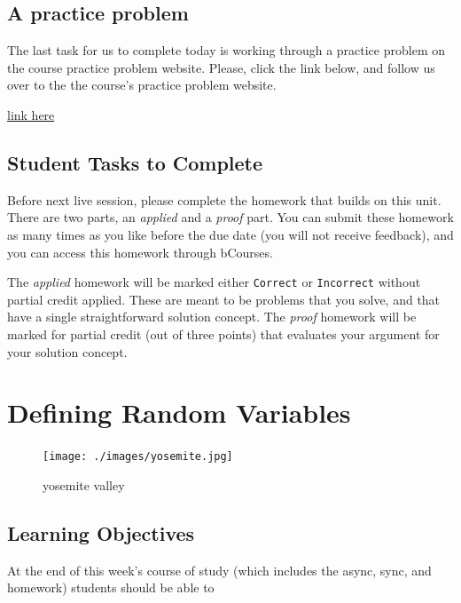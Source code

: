 \documentclass[
]{book}
\theoremstyle{definition}
\theoremstyle{definition}
\theoremstyle{definition}
\theoremstyle{definition}
\theoremstyle{remark}
\begin{document}
\hypertarget{a-practice-problem}{%
\section{A practice problem}\label{a-practice-problem}}

The last task for us to complete today is working through a practice problem on the course practice problem website. Please, click the link below, and follow us over to the the course's practice problem website.

\href{https://mids-w203.github.io/practice_problems/}{link here}

\hypertarget{student-tasks-to-complete}{%
\section{Student Tasks to Complete}\label{student-tasks-to-complete}}

Before next live session, please complete the homework that builds on this unit. There are two parts, an \emph{applied} and a \emph{proof} part. You can submit these homework as many times as you like before the due date (you will not receive feedback), and you can access this homework through bCourses.

The \emph{applied} homework will be marked either \texttt{Correct} or \texttt{Incorrect} without partial credit applied. These are meant to be problems that you solve, and that have a single straightforward solution concept. The \emph{proof} homework will be marked for partial credit (out of three points) that evaluates your argument for your solution concept.

\hypertarget{defining-random-variables}{%
\chapter{Defining Random Variables}\label{defining-random-variables}}

\begin{figure}
\centering
\texttt{[image: ./images/yosemite.jpg]}
\caption{yosemite valley}
\end{figure}

\hypertarget{learning-objectives-1}{%
\section{Learning Objectives}\label{learning-objectives-1}}

At the end of this week's course of study (which includes the async, sync, and homework) students should be able to
\end{document}
